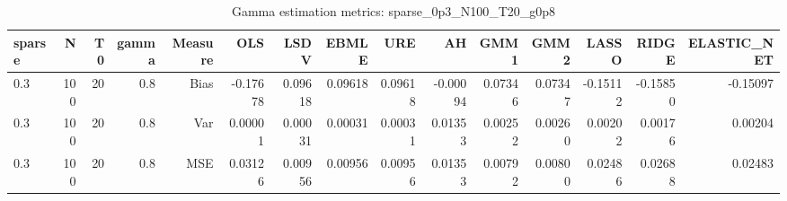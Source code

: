 \begin{table}[!htbp]\centering
\caption{Gamma estimation metrics: sparse_0p3_N100_T20_g0p8}
\label{tab:table1_sparse_0p3_N100_T20_g0p8}
\begin{tabular}{lrrrrrrrrrrrrrr}
\hline
sparse & N & T0 & gamma & Measure & OLS & LSDV & EBMLE & URE & AH & GMM1 & GMM2 & LASSO & RIDGE & ELASTIC_NET \\
\hline
0.3 & 100 & 20 & 0.8 & Bias & -0.17678 & 0.09618 & 0.09618 & 0.09618 & -0.00094 & 0.07346 & 0.07347 & -0.15112 & -0.15850 & -0.15097 \\
0.3 & 100 & 20 & 0.8 & Var & 0.00001 & 0.00031 & 0.00031 & 0.00031 & 0.01353 & 0.00252 & 0.00260 & 0.00202 & 0.00176 & 0.00204 \\
0.3 & 100 & 20 & 0.8 & MSE & 0.03126 & 0.00956 & 0.00956 & 0.00956 & 0.01353 & 0.00792 & 0.00800 & 0.02486 & 0.02688 & 0.02483 \\
\hline
\end{tabular}
\end{table}


